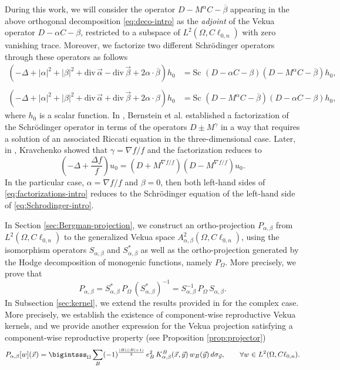 \documentclass[12pt]{article}
\def\div{\mbox{div}\,}
\begin{document}
During this work, we will consider the operator $D-M^{\alpha}C-\overline{\beta}$ appearing in the above orthogonal decomposition \eqref{eq:deco-intro} as the \textit{adjoint} of the Vekua operator $D-\alpha C-\beta$, restricted to a subspace of $L^2(\Omega, C\ell_{0,n})$ with zero vanishing trace. Moreover, we factorize two different Schrödinger operators through these operators as follows
\begin{align}\label{eq:factorizations-intro}
    \nonumber \left(-\Delta+|\alpha|^2+|\beta|^2+\div \vec \alpha-\div \vec \beta+2\alpha\cdot \overline{\beta}\right)h_0&=\text{Sc } (D-\alpha C-\beta)(D-M^{\alpha}C-\overline{\beta})h_0,\\
    \text{ }\\
    \nonumber\left(-\Delta+|\alpha|^2+|\beta|^2+\div \vec \alpha+\div \vec \beta+2\alpha\cdot \beta\right)h_0&=\text{Sc } (D-M^{\alpha}C-\overline{\beta})(D-\alpha C-\beta)h_0,
\end{align}
where $h_0$ is a scalar function.
In \cite{Bernstein1996, Bernstein1999}, Bernstein et al. established a factorization of the Schrödinger operator in terms of the operators $D\pm M^{\gamma}$ in a way that requires a solution of an associated Riccati equation in the three-dimensional case. Later, in \cite{KravKrav2001}, Kravchenko showed that $\gamma=\nabla f/f$ and the factorization reduces to
\begin{equation}\label{eq:Schrodinger-intro}
   \left(-\Delta+\dfrac{\Delta f}{f}\right)u_0=(D+M^{\nabla f/f})(D-M^{\nabla f/f})u_0.
\end{equation}
In the particular case, $\alpha=\nabla f /f$ and $\beta=0$, then both left-hand sides of \eqref{eq:factorizations-intro} reduces to the Schrödinger equation of the left-hand side of \eqref{eq:Schrodinger-intro}.

In Section \ref{sec:Bergman-projection}, we construct an ortho-projection $P_{\alpha,\beta}$ from $L^2(\Omega, C\ell_{0,n})$ to the generalized Vekua space $A^2_{\alpha,\beta}(\Omega, C\ell_{0,n})$, using the isomorphism operators $S_{\alpha,\beta}$ and $S_{\alpha,\beta}^*$ as well as the ortho-projection generated by the Hodge decomposition of monogenic functions, namely $P_{\Omega}$. More precisely, we prove that
\begin{equation}
    P_{\alpha,\beta}=S_{\alpha,\beta}^*\, P_{\Omega}\,(S_{\alpha,\beta}^*)^{-1}=S_{\alpha,\beta}^{-1} \,P_{\Omega} \,S_{\alpha,\beta}.
\end{equation}
In Subsection \ref{sec:kernel}, we extend the results provided in \cite{Campos2020} for the complex case. More precisely, we establish the existence of component-wise reproductive Vekua kernels, and we provide another expression for the Vekua projection satisfying a component-wise reproductive property (see Proposition \ref{prop:projector})
\begin{equation}\label{eq:reproductive-intro}
P_{\alpha,\beta}[w](\vec x)=\bigintsss_{\Omega} \sum_B (-1)^{\frac{|B|(|B|+1)}{2}}\, e_B^2\,  K^B_{\alpha,\beta}(\vec x,\vec y) \, w_B(\vec y) \,d\sigma_{\vec y}, \qquad \forall w\in L^2(\Omega,C\ell_{0,n}). 
\end{equation}
\end{document}
